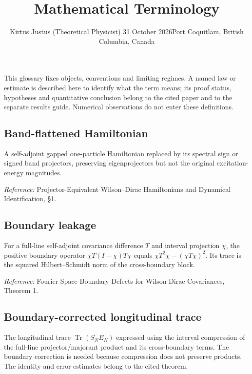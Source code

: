 \documentclass[
  10pt,
  a4paper,
]{article}
\title{Mathematical Terminology}
\author{Kirtus Justus (Theoretical Physicist) \textbullet{} 31 October 2026\tabularnewline Port Coquitlam, British Columbia, Canada}
\date{}
\begin{document}
\maketitle

This glossary fixes objects, conventions and limiting regimes. A named law or estimate is described here to identify what the term means; its proof status, hypotheses and quantitative conclusion belong to the cited paper and to the separate results guide. Numerical observations do not enter these definitions.

\subsection{Band-flattened Hamiltonian}\label{band-flattened-hamiltonian}

A self-adjoint gapped one-particle Hamiltonian replaced by its spectral sign or signed band projectors, preserving eigenprojectors but not the original excitation-energy magnitudes.

\nopagebreak[4]

\emph{Reference:} Projector-Equivalent Wilson--Dirac Hamiltonians and Dynamical Identification, §1.

\subsection{Boundary leakage}\label{boundary-leakage}

For a full-line self-adjoint covariance difference \(T\) and interval projection \(\chi\), the positive boundary operator \(\chi T(I-\chi)T\chi\) equals \(\chi T^2\chi-(\chi T\chi)^2\). Its trace is the squared Hilbert--Schmidt norm of the cross-boundary block.

\nopagebreak[4]

\emph{Reference:} Fourier-Space Boundary Defects for Wilson-Dirac Covariances, Theorem 1.

\subsection{Boundary-corrected longitudinal trace}\label{boundary-corrected-longitudinal-trace}

The longitudinal trace \(\operatorname{Tr}(S_NE_N)\) expressed using the interval compression of the full-line projector/majorant product and its cross-boundary terms. The boundary correction is needed because compression does not preserve products. The identity and error estimates belong to the cited theorem.
\end{document}
